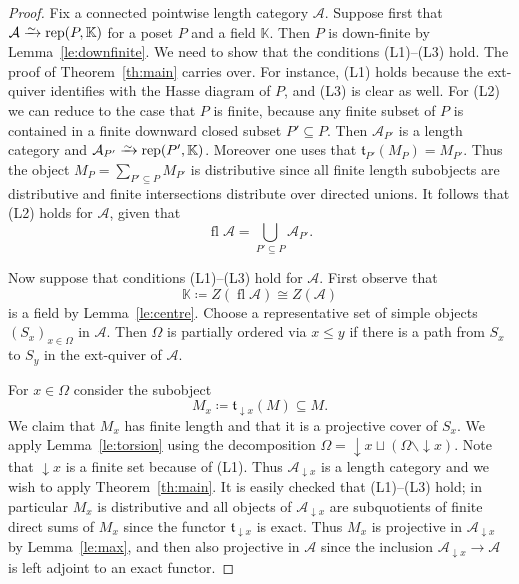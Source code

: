 \documentclass[a4paper]{amsart}
\theoremstyle{plain}
\theoremstyle{definition}
\theoremstyle{remark}
\numberwithin{equation}{section}
\newcommand{\fl}{\operatorname{fl}}
\newcommand{\rep}{\operatorname{rep}}
\newcommand{\iso}{\xrightarrow{\raisebox{-.4ex}[0ex][0ex]{$\scriptstyle{\sim}$}}}
\def\A{\mathcal A}
\def\bbK{\mathbb K}
\newcommand{\frt}{\mathfrak{t}}
\def\Om{\Omega}
\begin{document}
\begin{proof}
  Fix a connected pointwise length category $\A$.  Suppose first that
  $\A\iso\rep(P,\bbK)$ for a poset $P$ and a field $\bbK$. Then $P$ is
  down-finite by Lemma~\ref{le:downfinite}. We need to show that the
  conditions (L1)--(L3) hold. The proof of Theorem~\ref{th:main}
  carries over. For instance, (L1) holds because the ext-quiver
  identifies with the Hasse diagram of $P$, and (L3) is clear as well.
  For (L2) we can reduce to the case that $P$ is finite, because any
  finite subset of $P$ is contained in a finite downward closed subset
  $P'\subseteq P$. Then $\A_{P'}$ is a length category and
  $\A_{P'}\iso\rep(P',\bbK)$. Moreover one uses that
  $\frt_{P'}(M_P)=M_{P'}$. Thus the object
  $M_P=\sum_{P'\subseteq P} M_{P'}$ is distributive since all
  finite length subobjects are distributive and finite intersections
  distribute over directed unions. It follows that (L2) holds for $\A$,
  given that
  \[\fl\A=\bigcup_{P'\subseteq P}\A_{P'}.\]

  Now suppose that conditions (L1)--(L3) hold for $\A$. First observe
  that \[\bbK\coloneqq Z(\fl\A)\cong Z(\A)\] is a field by
  Lemma~\ref{le:centre}. Choose a representative set of simple
  objects $(S_x)_{x\in \Om}$ in $\A$. Then $\Om$ is partially ordered  via $x\le y$ if
  there is a path from $S_x$ to $S_y$ in the ext-quiver of $\A$. 

  For $x\in \Om$ consider the subobject
  \[M_x\coloneqq \frt_{\downarrow x}(M)\subseteq M.\] We claim that $M_x$
  has finite length and that it is a projective cover of $S_x$. We
  apply Lemma~\ref{le:torsion} using the decomposition
  $\Om=\downarrow\!  x\sqcup(\Om\smallsetminus\downarrow\! x)$. Note that
  $\downarrow\!  x$ is a finite set because of (L1).
Thus $\A_{\downarrow x}$ is a length category and we wish to apply
  Theorem~\ref{th:main}.  It is easily checked that (L1)--(L3) hold; in
  particular $M_x$ is distributive and all objects of
  $\A_{\downarrow x}$ are subquotients of finite direct sums of $M_x$
  since the functor $\frt_{\downarrow x}$ is exact. Thus $M_x$ is
  projective in $\A_{\downarrow x}$ by Lemma~\ref{le:max},
  and then also projective in $\A$ since the inclusion
  $\A_{\downarrow x}\to\A$ is left adjoint to an exact functor.


\end{proof}
\end{document}
